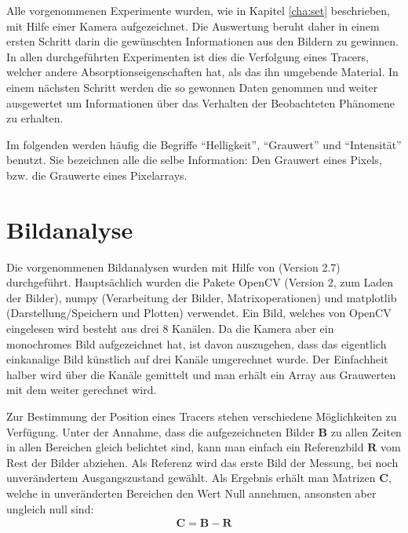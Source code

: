 \label{cha:met}

Alle vorgenommenen Experimente wurden, wie in Kapitel \ref{cha:set} beschrieben, mit Hilfe einer Kamera aufgezeichnet. Die Auswertung beruht daher in einem ersten Schritt darin die gewünschten Informationen aus den Bildern zu gewinnen. In allen durchgeführten Experimenten ist dies die Verfolgung eines Tracers, welcher andere Absorptionseigenschaften hat, als das ihn umgebende Material.
In einem nächsten Schritt werden die so gewonnen Daten genommen und weiter ausgewertet um Informationen über das Verhalten der Beobachteten Phänomene zu erhalten.

Im folgenden werden häufig die Begriffe ``Helligkeit'', ``Grauwert'' und ``Intensität'' benutzt. Sie bezeichnen alle die selbe Information: Den Grauwert  eines Pixels, bzw. die Grauwerte eines Pixelarrays.

\section{Bildanalyse}
\label{sec:ima}
Die vorgenommenen Bildanalysen wurden mit Hilfe von \cite{python} (Version 2.7) durchgeführt. Hauptsächlich wurden die Pakete OpenCV (Version 2, zum Laden der Bilder), numpy (Verarbeitung der Bilder, Matrixoperationen) und matplotlib (Darstellung/Speichern und Plotten) verwendet.
Ein Bild, welches von OpenCV eingelesen wird besteht aus drei \SI{8}{\bit} Kanälen. Da die Kamera aber ein monochromes Bild aufgezeichnet hat, ist davon auszugehen, dass das eigentlich einkanalige Bild künstlich auf drei Kanäle umgerechnet wurde. Der Einfachheit halber wird über die Kanäle gemittelt und man erhält ein Array aus Grauwerten mit dem weiter gerechnet wird.

Zur Bestimmung der Position eines Tracers stehen verschiedene Möglichkeiten zu Verfügung.
Unter der Annahme, dass die aufgezeichneten Bilder $\mathbf{B}$ zu allen Zeiten in allen Bereichen gleich belichtet sind, kann man einfach ein Referenzbild $\mathbf{R}$ vom Rest der Bilder abziehen. Als Referenz wird das erste Bild der Messung, bei noch unverändertem Ausgangszustand gewählt.
Als Ergebnis erhält man Matrizen $\mathbf{C}$, welche in unveränderten Bereichen den Wert Null annehmen, ansonsten aber ungleich null sind:
\begin{eqnarray}
 \mathbf{C} = \mathbf{B} - \mathbf{R}
\end{eqnarray}


